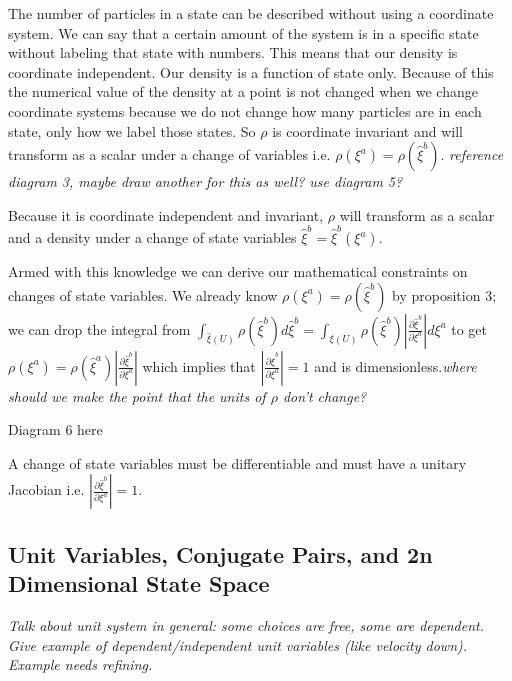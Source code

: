 \documentclass{article}
\begin{document}
	The number of particles in a state can be described without using a coordinate system. We can say that a certain amount of the system is in a specific state without labeling that state with numbers. This means that our density is coordinate independent. Our density is a function of state only. Because of this the numerical value of the density at a point is not changed when we change coordinate systems because we do not change how many particles are in each state, only how we label those states. So $\rho$ is coordinate invariant and will transform as a scalar under a change of variables i.e. $\rho(\xi^a) = \rho(\hat{\xi}^b)$. \emph{reference diagram 3, maybe draw another for this as well? use diagram 5?}

\begin{prop}
	Because it is coordinate independent and invariant, $\rho$ will transform as a scalar and a density under a change of state variables $\hat{\xi}^b = \hat{\xi}^b(\xi^a)$.
\end{prop}

	Armed with this knowledge we can derive our mathematical constraints on changes of state variables. We already know $\rho(\xi^a) = \rho(\hat{\xi}^b)$ by proposition 3; we can drop the integral from $\int_{\hat{\xi}(U)} \rho(\hat{\xi}^b)d\hat{\xi}^b = \int_{\xi(U)} \rho(\hat{\xi}^b)\left|\frac{\partial\hat{\xi}^b}{\partial\xi^a}\right|d\xi^a$ to get $\rho(\xi^a) = \rho(\hat{\xi}^a)\left|\frac{\partial\hat{\xi}^b}{\partial\xi^a}\right|$ which implies that $\left|\frac{\partial\hat{\xi}^b}{\partial\xi^a}\right| = 1$ and is dimensionless.\emph{where should we make the point that the units of $\rho$ don't change?}
	
Diagram 6 here
	
\begin{prop}
	A change of state variables must be differentiable and must have a unitary Jacobian i.e. $\left|\frac{\partial\hat{\xi}^b}{\partial\xi^a}\right| = 1$.
\end{prop}

\subsection{Unit Variables, Conjugate Pairs, and 2n Dimensional State Space}

\emph{Talk about unit system in general: some choices are free, some are dependent. Give example of dependent/independent unit variables (like velocity down). Example needs refining.}
\end{document}
